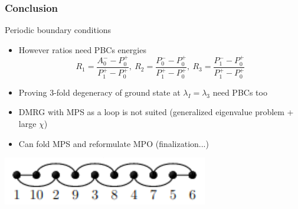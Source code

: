 \documentclass[10pt]{beamer}
\begin{document}
\begin{frame}
    \frametitle{Conclusion}

    \begin{block}{Periodic boundary conditions}
        \begin{itemize}
            \item However ratios need PBCs energies $$R_1 = \frac{A_0^- - P_0^+}{P_1^+-P_0^+},\ R_2 = \frac{P_0^- - P_0^+}{P_1^+-P_0^+},\ R_3 = \frac{P_1^- - P_0^+}{P_1^+-P_0^+}$$
            \pause
            \item Proving 3-fold degeneracy of ground state at $\lambda_I=\lambda_3$ need PBCs too
            \pause
            \item DMRG with MPS as a loop is not suited (generalized eigenvalue problem + large $\chi$)
            \pause
            \item Can fold MPS and reformulate MPO (finalization...)
        \end{itemize}
    \end{block}

    \vspace{0.5cm}
    \hspace{1cm}
    \includegraphics[scale=0.43]{figs/foldedMPS.png}
\end{frame}
\end{document}
